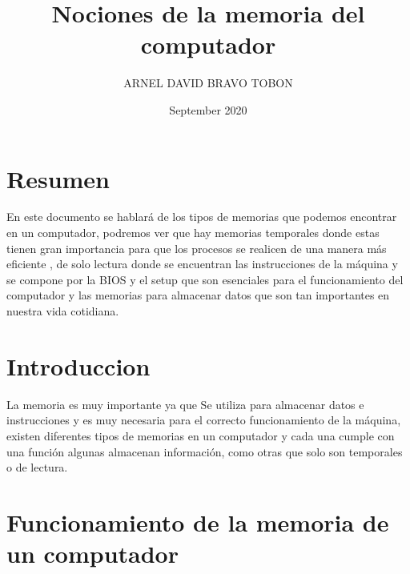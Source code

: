 \documentclass{article}
\title{Nociones de la memoria del computador}
\author{ARNEL DAVID BRAVO TOBON  }
\date{September 2020}
\begin{document}
\maketitle
\section*{Resumen}
En este documento se hablará de los tipos de memorias que podemos encontrar en un computador, podremos ver que hay memorias temporales donde estas tienen gran importancia para que los procesos se realicen de una manera más eficiente , de solo lectura donde se encuentran las instrucciones de la máquina y se compone por la BIOS y el setup que son esenciales para el funcionamiento del computador y las memorias para almacenar datos que son tan importantes en nuestra vida cotidiana. 

\section*{Introduccion}
La memoria es muy importante ya que Se utiliza para almacenar datos e instrucciones y es muy necesaria para el correcto funcionamiento de la máquina, existen diferentes tipos de memorias en un computador y cada una cumple con una función algunas almacenan información, como otras que solo son temporales o de lectura.


\section*{Funcionamiento de la memoria de un computador}
\end{document}
